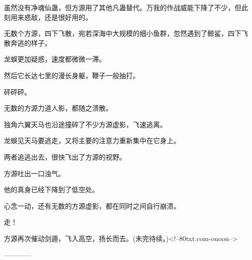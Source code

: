 \begin{this_body}
虽然没有净魂仙蛊，但方源用了其他凡蛊替代。万我的作战威能下降了不少，但此刻用来惑敌，还是很好用的。

无数个方源，四下飞散，宛若深海中大规模的细小鱼群，忽然遇到了鲸鲨，四下飞散奔逃的样子。

龙蜈更加疑惑，速度都微微一滞。

然后它长达七里的漫长身躯，鞭子一般抽打。

砰砰砰。

无数的方源力道人影，都随之溃散。

独角六翼天马也沿途撞碎了不少方源虚影，飞速逃离。

龙蜈见天马要逃走，又将主要的注意力重新集中在它身上。

两者追逃出去，很快飞出了方源的视野。

方源吐出一口浊气。

他的真身已经下降到了低空处。

心念一动，还有无数的方源虚影，都在同时之间自行崩溃。

走！

方源再次催动剑遁，飞入高空，扬长而去。(未完待续。)<!--80txt.com-ouoou-->

------------

\end{this_body}


